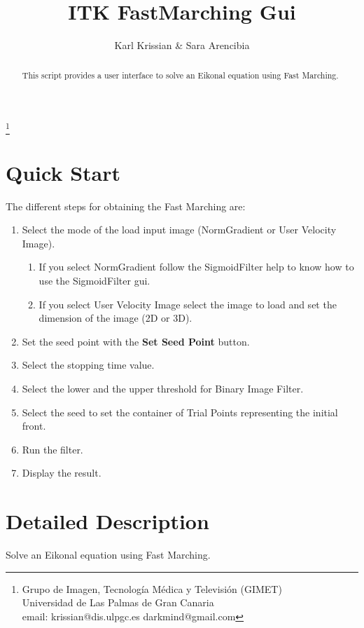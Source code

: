 \documentclass{article}
\begin{document}
\title{ITK FastMarching Gui}
\author{Karl Krissian \& Sara Arencibia}
\thanks{
Grupo de Imagen, Tecnolog\'ia M\'edica y Televisi\'on (GIMET)\\
Universidad de Las Palmas de Gran Canaria\\
email: krissian@dis.ulpgc.es darkmind@gmail.com
}


\maketitle

\begin{abstract}
This script provides a user interface to solve an Eikonal equation using Fast Marching. 
\end{abstract}


\section{Quick Start}

The different steps for obtaining the Fast Marching are:
\begin{enumerate}
  \item Select the mode of the load input image (NormGradient or User Velocity Image).
    \begin{enumerate}
      \item If you select NormGradient follow the SigmoidFilter help to know how to use the SigmoidFilter gui.
      \item If you select User Velocity Image select the image to load and set the dimension of the image (2D or 3D).
    \end{enumerate}
  \item Set the seed point with the {\bf Set Seed Point} button.
  \item Select the stopping time value. 
  \item Select the lower and the upper threshold for Binary Image Filter.
  \item Select the seed to set the container of Trial Points representing the initial front.
  \item Run the filter.
  \item Display the result.
\end{enumerate}


\section{Detailed Description}
Solve an Eikonal equation using Fast Marching.
\end{document}
